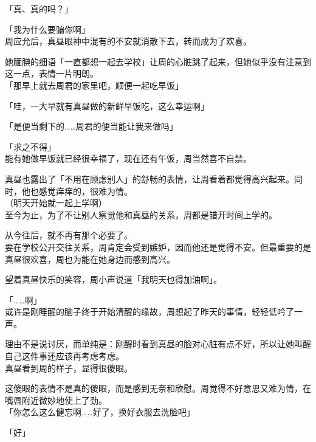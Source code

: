 「真、真的吗？」

「我为什么要骗你啊」\\

周应允后，真昼眼神中混有的不安就消散下去，转而成为了欢喜。

她腼腆的细语「一直都想一起去学校」让周的心脏跳了起来，但她似乎没有注意到这一点，表情一片明朗。\\

「那早上就去周君的家里吧，顺便一起吃早饭」

「哇，一大早就有真昼做的新鲜早饭吃，这么幸运啊」

「是便当剩下的……周君的便当能让我来做吗」

「求之不得」\\

能有她做早饭就已经很幸福了，现在还有午饭，周当然喜不自禁。

真昼也露出了「不用在顾虑别人」的舒畅的表情，让周看着都觉得高兴起来。同时，他也感觉痒痒的，很难为情。\\

（明天开始就一起上学啊）\\

至今为止，为了不让别人察觉他和真昼的关系，周都是错开时间上学的。

从今往后，就不再有那个必要了。\\

要在学校公开交往关系，周肯定会受到嫉妒，因而他还是觉得不安。但最重要的是真昼很欢喜，周也为能在她身边而感到高兴。

望着真昼快乐的笑容，周小声说道「我明天也得加油啊」。\\

\vspace{2\baselineskip}

「……啊」\\

或许是刚睡醒的脑子终于开始清醒的缘故，周想起了昨天的事情，轻轻低吟了一声。

理由不是说讨厌，而单纯是：刚醒时看到真昼的脸对心脏有点不好，所以让她叫醒自己这件事还应该再考虑考虑。\\

真昼看到周的样子，显得很傻眼。

这傻眼的表情不是真的傻眼，而是感到无奈和欣慰。周觉得不好意思又难为情，在嘴唇附近微妙地使上了劲。\\

「你怎么这么健忘啊……好了，换好衣服去洗脸吧」

「好」\\

